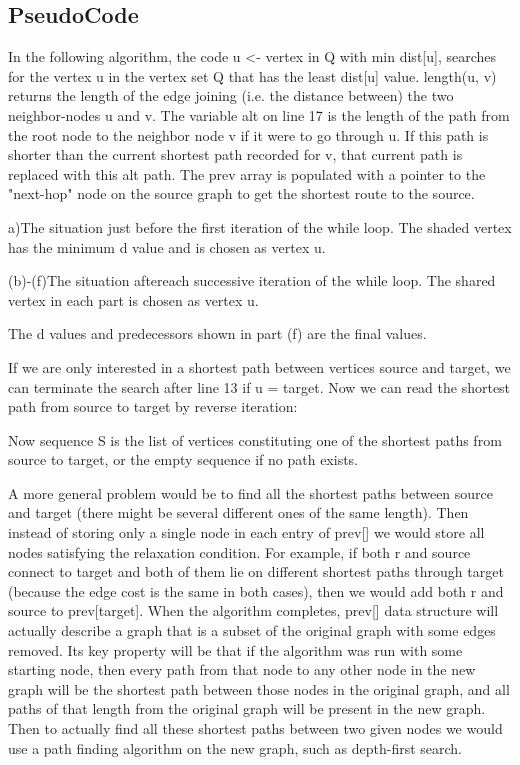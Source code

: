 \documentclass{article}
\begin{document}
\subsection{PseudoCode}

In the following algorithm, the code u <- vertex in Q with min dist[u], searches for the vertex u in the vertex set Q that has the least dist[u] value. length(u, v) returns the length of the edge joining (i.e. the distance between) the two neighbor-nodes u and v. The variable alt on line 17 is the length of the path from the root node to the neighbor node v if it were to go through u. If this path is shorter than the current shortest path recorded for v, that current path is replaced with this alt path. The prev array is populated with a pointer to the "next-hop" node on the source graph to get the shortest route to the source.

a)The situation just before the first iteration of the while loop. The shaded vertex has the minimum d value and is chosen as vertex u.

(b)-(f)The situation aftereach successive iteration of the while loop. The shared vertex in each part is chosen as vertex u. 

The d values and predecessors shown in part (f) are the final values.
\begin{framed}
    
    
\end{framed}

If we are only interested in a shortest path between vertices source and target, we can terminate the search after line 13 if u = target. Now we can read the shortest path from source to target by reverse iteration:
\begin{framed}
        

\end{framed}

Now sequence S is the list of vertices constituting one of the shortest paths from source to target, or the empty sequence if no path exists.

A more general problem would be to find all the shortest paths between source and target (there might be several different ones of the same length). Then instead of storing only a single node in each entry of prev[] we would store all nodes satisfying the relaxation condition. For example, if both r and source connect to target and both of them lie on different shortest paths through target (because the edge cost is the same in both cases), then we would add both r and source to prev[target]. When the algorithm completes, prev[] data structure will actually describe a graph that is a subset of the original graph with some edges removed. Its key property will be that if the algorithm was run with some starting node, then every path from that node to any other node in the new graph will be the shortest path between those nodes in the original graph, and all paths of that length from the original graph will be present in the new graph. Then to actually find all these shortest paths between two given nodes we would use a path finding algorithm on the new graph, such as depth-first search.
\end{document}
